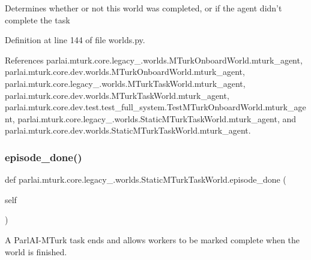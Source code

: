 \begin{DoxyVerb}Determines whether or not this world was completed, or if the agent
didn't complete the task\end{DoxyVerb}
 

Definition at line 144 of file worlds.\+py.



References parlai.\+mturk.\+core.\+legacy\+\_.\+worlds.\+M\+Turk\+Onboard\+World.\+mturk\+\_\+agent, parlai.\+mturk.\+core.\+dev.\+worlds.\+M\+Turk\+Onboard\+World.\+mturk\+\_\+agent, parlai.\+mturk.\+core.\+legacy\+\_.\+worlds.\+M\+Turk\+Task\+World.\+mturk\+\_\+agent, parlai.\+mturk.\+core.\+dev.\+worlds.\+M\+Turk\+Task\+World.\+mturk\+\_\+agent, parlai.\+mturk.\+core.\+dev.\+test.\+test\+\_\+full\+\_\+system.\+Test\+M\+Turk\+Onboard\+World.\+mturk\+\_\+agent, parlai.\+mturk.\+core.\+legacy\+\_.\+worlds.\+Static\+M\+Turk\+Task\+World.\+mturk\+\_\+agent, and parlai.\+mturk.\+core.\+dev.\+worlds.\+Static\+M\+Turk\+Task\+World.\+mturk\+\_\+agent.

\mbox{\label{classparlai_1_1mturk_1_1core_1_1legacy__2018_1_1worlds_1_1StaticMTurkTaskWorld_a02a802c1de6d6acd815ae83cbfd82eeb}} 
\subsubsection{\texorpdfstring{episode\+\_\+done()}{episode\_done()}}
{\footnotesize\ttfamily def parlai.\+mturk.\+core.\+legacy\+\_.\+worlds.\+Static\+M\+Turk\+Task\+World.\+episode\+\_\+done (\begin{DoxyParamCaption}\item[{}]{self }\end{DoxyParamCaption})}

\begin{DoxyVerb}A ParlAI-MTurk task ends and allows workers to be marked complete
when the world is finished.
\end{DoxyVerb}
 

